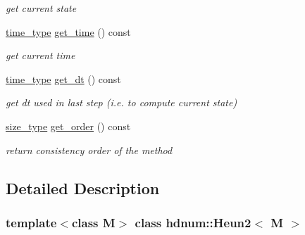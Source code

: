 \begin{DoxyCompactItemize}
\begin{DoxyCompactList}\small\item\em get current state \item\end{DoxyCompactList}\item 
\hypertarget{classhdnum_1_1Heun2_a5ad86e97fa21759e935b1e79b7ff4029}{
\hyperlink{classhdnum_1_1Heun2_ac2e59a8551ffbce1455c0fd5266965fd}{time\_\-type} \hyperlink{classhdnum_1_1Heun2_a5ad86e97fa21759e935b1e79b7ff4029}{get\_\-time} () const }
\label{classhdnum_1_1Heun2_a5ad86e97fa21759e935b1e79b7ff4029}

\begin{DoxyCompactList}\small\item\em get current time \item\end{DoxyCompactList}\item 
\hypertarget{classhdnum_1_1Heun2_abde1a7c6195ecfd92184ed9d08173806}{
\hyperlink{classhdnum_1_1Heun2_ac2e59a8551ffbce1455c0fd5266965fd}{time\_\-type} \hyperlink{classhdnum_1_1Heun2_abde1a7c6195ecfd92184ed9d08173806}{get\_\-dt} () const }
\label{classhdnum_1_1Heun2_abde1a7c6195ecfd92184ed9d08173806}

\begin{DoxyCompactList}\small\item\em get dt used in last step (i.e. to compute current state) \item\end{DoxyCompactList}\item 
\hypertarget{classhdnum_1_1Heun2_a943af41b853f8b3d37e1889a6e60a17b}{
\hyperlink{classhdnum_1_1Heun2_a32d59e62cf1c8dcc50cd2583fae3bf09}{size\_\-type} \hyperlink{classhdnum_1_1Heun2_a943af41b853f8b3d37e1889a6e60a17b}{get\_\-order} () const }
\label{classhdnum_1_1Heun2_a943af41b853f8b3d37e1889a6e60a17b}

\begin{DoxyCompactList}\small\item\em return consistency order of the method \item\end{DoxyCompactList}\end{DoxyCompactItemize}


\subsection{Detailed Description}
\subsubsection*{template$<$class M$>$ class hdnum::Heun2$<$ M $>$}

